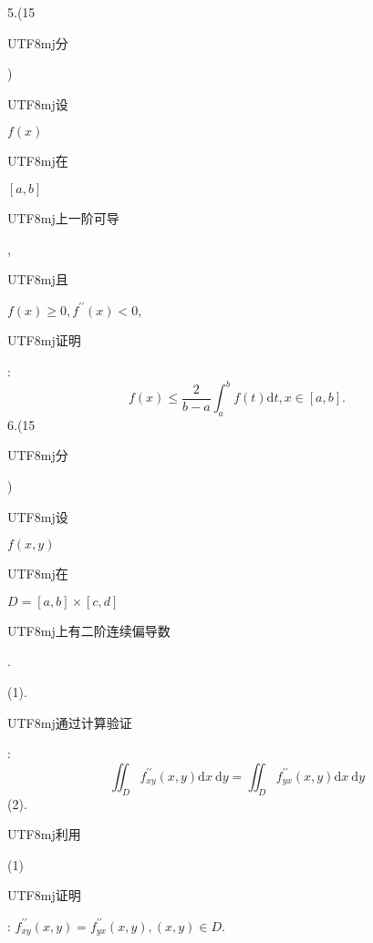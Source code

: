 \documentclass[10pt]{article}
\begin{document}
5.(15 \begin{CJK}{UTF8}{mj}分\end{CJK}) \begin{CJK}{UTF8}{mj}设\end{CJK} $f(x)$ \begin{CJK}{UTF8}{mj}在\end{CJK} $[a, b]$ \begin{CJK}{UTF8}{mj}上一阶可导\end{CJK}, \begin{CJK}{UTF8}{mj}且\end{CJK} $f(x) \geqslant 0, f^{\prime \prime}(x)<0$, \begin{CJK}{UTF8}{mj}证明\end{CJK}:
$$
f(x) \leqslant \frac{2}{b-a} \int_{a}^{b} f(t) \mathrm{d} t, x \in[a, b] .
$$
6.(15 \begin{CJK}{UTF8}{mj}分\end{CJK}) \begin{CJK}{UTF8}{mj}设\end{CJK} $f(x, y)$ \begin{CJK}{UTF8}{mj}在\end{CJK} $D=[a, b] \times[c, d]$ \begin{CJK}{UTF8}{mj}上有二阶连续偏导数\end{CJK}.

(1). \begin{CJK}{UTF8}{mj}通过计算验证\end{CJK}:
$$
\iint_{D} f_{x y}^{\prime \prime}(x, y) \mathrm{d} x \mathrm{~d} y=\iint_{D} f_{y x}^{\prime \prime}(x, y) \mathrm{d} x \mathrm{~d} y
$$
(2). \begin{CJK}{UTF8}{mj}利用\end{CJK} (1) \begin{CJK}{UTF8}{mj}证明\end{CJK}: $f_{x y}^{\prime \prime}(x, y)=f_{y x}^{\prime \prime}(x, y),(x, y) \in D$.
\end{document}
